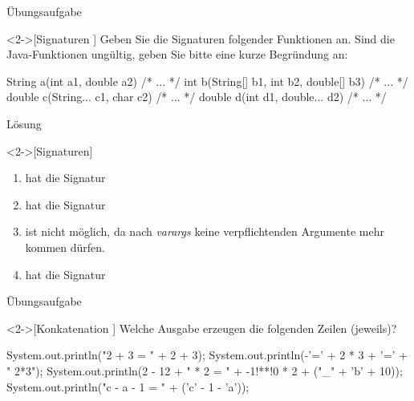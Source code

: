 \begin{frame}[c,fragile]{Übungsaufgabe}
    \begin{exercise}<2->[Signaturen ]
        \pause{}Geben Sie die Signaturen folgender Funktionen an.\pause{} Sind die Java-Funktionen ungültig, geben Sie bitte eine kurze Begründung an:\pause{}
        \begin{plainvoid}
String a(int a1, double a2) { /* ... */ }
int b(String[] b1, int b2, double[] b3) { /* ... */ }
double c(String... c1, char c2) { /* ... */ }
double d(int d1, double... d2) { /* ... */ }
        \end{plainvoid}
    \end{exercise}
\end{frame}

\begin{frame}[c]{Lösung}
    \begin{solve}<2->[Signaturen]
        \begin{enumerate}[<+(1)->]
            \item {} hat die Signatur 
            \item {} hat die Signatur 
            \item {} ist nicht möglich,\pause{} da nach \emph{varargs} keine verpflichtenden Argumente mehr kommen dürfen.
            \item {} hat die Signatur 
        \end{enumerate}
    \end{solve}
\end{frame}


\begin{frame}[c,fragile]{Übungsaufgabe}
    \begin{exercise}<2->[Konkatenation ]
        \pause{}Welche Ausgabe erzeugen die folgenden Zeilen (jeweils)?\pause{}
        \begin{plainjava}
System.out.println("2 + 3 = " + 2 + 3);
System.out.println(-'=' + 2 * 3 + '=' + " 2*3");
System.out.println(2 - 12 + " * 2 = " + -1!**!0 * 2 + ("_" + 'b' + 10));
System.out.println("c - a - 1 = " + ('c' - 1 - 'a'));
        \end{plainjava}
    \end{exercise}
\end{frame}

